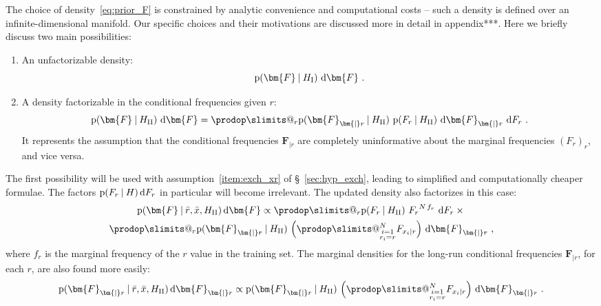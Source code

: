 \documentclass[\ifafour a4paper,12pt,\else a5paper,10pt,\fi%
onecolumn,oneside,article,%
british%
]{memoir}
\makeatletter
\theoremstyle{remark}
\theoremstyle{innote}
\def\prod{\DOTSI\prodop\slimits@}
\newcommand*{\di}{\mathrm{d}}%
\newcommand*{\p}{\mathrm{p}}%
\renewcommand*{\|}[1][]{\nonscript\:#1\vert\nonscript\:\mathopen{}}
\renewcommand*{\=}{\TextOrMath\texteq\eq}
\newcommand*{\sect}{\S}%
\newcommand*{\wrench}{{\fontencoding{U}\fontfamily{fontawesomethree}\selectfont\symbol{114}}}
\newcommand{\mynote}[1]{ {\color{notecolour}#1}}
\newcommand*{\q}{}%
\DeclareRobustCommand*{\q}{%
  \mathord{\mathpalette\bigcdot@{}}%
}
\newcommand*{\bigcdot@scalefactor}{0.7}
\newcommand*{\bigcdot@widthfactor}{1.5}
\newcommand*{\bigcdot@}[2]{%
  \sbox0{$#1\vcenter{}$}%
  \sbox2{$#1\cdot\m@th$}%
  \hbox to \bigcdot@widthfactor\wd2{%
    \hfil
    \raise\ht0\hbox{%
      \scalebox{\bigcdot@scalefactor}{%
        \lower\ht0\hbox{$#1\bullet\m@th$}%
      }%
    }%
    \hfil
  }%
}
\newcommand*{\ro}{r}
\newcommand*{\rd}{\bar{r}}
\newcommand*{\xd}{\bar{x}}
\newcommand*{\yF}{\bm{F}}
\newcommand*{\yFr}{\yF_{\bm{\mid}r}}
\makeatother
\begin{document}
The choice of density~\eqref{eq:prior_F} is constrained by analytic
convenience and computational costs -- such a density is defined over an
infinite-dimensional manifold. Our specific choices and their motivations are
discussed more in detail in \mynote{\wrench appendix***}. Here we briefly
discuss two main possibilities:
\begin{enumerate}[label=\Roman*.]
\item\label{item:p_F_unfactorizable} An unfactorizable density:
    \begin{equation}
    \label{eq:p_F_unfactorizable}
    \p(\yF\| H_{\textrm{I}})\ \di\yF
    \ .
  \end{equation}

\item\label{item:p_F_factorizable} A density factorizable in the
  conditional frequencies given $r$:
  \begin{equation}
    \label{eq:p_F_factorizable}
    \p(\yF\| H_{\textrm{II}})\ \di\yF =
    \prod_{r} \p(\yFr \| H_{\textrm{II}})\
    \p(F_{r\q} \| H_{\textrm{II}})\ \di\yFr\ \di F_{r\q} \ .
  \end{equation}
  It represents the assumption that the conditional frequencies $\yFr$ are
  completely uninformative about the marginal frequencies $(F_{r\q})_{r}$,
  and vice versa.
\end{enumerate}
The first possibility will be used with assumption~\ref{item:exch_xr} of
\sect~\ref{sec:hyp_exch}, leading to simplified and computationally cheaper
formulae. The factors $\p(F_{r\q} \| H)\,\di F_{r\q}$ in particular will
become irrelevant. The updated density also factorizes in this case:
  \begin{multline}
  \label{eq:post_prob_F_factorizable}
  \p(\yF\|\rd,\xd, H_{\textrm{II}})\,\di\yF \propto
  \prod_{r} \p(F_{r\q} \| H_{\textrm{II}})\ {F_{r\q}}^{N\,f_{r\q}}\
  \di F_{r\q} \times{}\\
  \prod_{r} \p(\yFr \| H_{\textrm{II}})\
  \Bigl(\prod_{\substack{i=1\\r_{i}=\ro}}^{N} F_{x_{i}\mid \ro}\Bigr)\ \di\yFr \ ,
\end{multline}
where $f_{r\q}$ is the marginal frequency of the $r$ value in the training
set. The marginal densities for the long-run conditional frequencies
$\yFr$, for each $r$, are also found more easily:
  \begin{equation}
  \label{eq:post_prob_Fxcondr}
  \p(\yFr\|\rd,\xd, H_{\textrm{II}})\,\di\yFr \propto
  \p(\yFr \| H_{\textrm{II}})\
  \Bigl(\prod_{\substack{i=1\\r_{i}=\ro}}^{N} F_{x_{i}\mid \ro}\Bigr)\ \di\yFr \ .
\end{equation}
\end{document}
